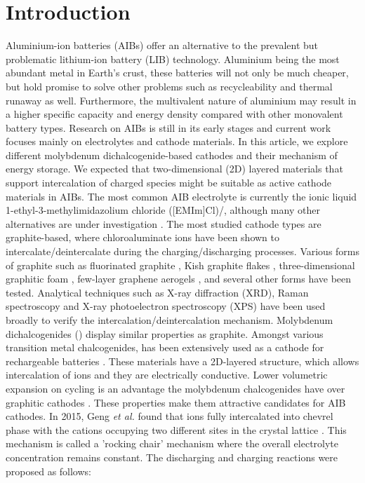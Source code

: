 \section{Introduction}
Aluminium-ion batteries (AIBs) offer an alternative to the prevalent but problematic lithium-ion battery (LIB) technology. Aluminium being the most abundant metal in Earth’s crust, these batteries will not only be much cheaper, but hold promise to solve other problems such as recycleability and thermal runaway as well. Furthermore, the multivalent nature of aluminium may result in a higher specific capacity and energy density compared with other monovalent battery types. Research on AIBs is still in its early stages and current work focuses mainly on electrolytes and cathode materials. In this article, we explore different molybdenum dichalcogenide-based cathodes and their mechanism of energy storage. We expected that two-dimensional (2D) layered materials that support intercalation of charged species might be suitable as active cathode materials in AIBs.
The most common AIB electrolyte is currently the ionic liquid 1-ethyl-3-methylimidazolium chloride ([EMIm]Cl)/, although many other alternatives are under investigation \cite{canever_acetamide_2018}. The most studied cathode types are graphite-based, where chloroaluminate ions  have been shown to intercalate/deintercalate during the charging/discharging processes. Various forms of graphite such as fluorinated graphite \cite{rani_fluorinated_2013}, Kish graphite flakes \cite{wang_kish_2017}, three-dimensional graphitic foam \cite{lin_ultrafast_2015-3}, few-layer graphene aerogels \cite{qiao_defect-free_2019}, and several other forms have been tested. Analytical techniques such as X-ray diffraction (XRD), Raman spectroscopy and X-ray photoelectron spectroscopy (XPS) have been used broadly to verify the intercalation/deintercalation mechanism. 
Molybdenum dichalcogenides () display similar properties as graphite. Amongst various transition metal chalcogenides,  has been extensively used as a cathode for rechargeable batteries \cite{li_rechargeable_2018-1, zhu_fast_2015}. These materials have a 2D-layered structure, which allows intercalation of ions and they are electrically conductive. Lower volumetric expansion on cycling is an advantage the molybdenum chalcogenides have over graphitic cathodes \cite{liang_rechargeable_2011,hu}. These properties make them attractive candidates for AIB cathodes. In 2015, Geng \textit{et al.} found that  ions fully intercalated into chevrel phase  with the cations occupying two different sites in the crystal lattice \cite{geng_reversible_2015}. This mechanism is called a 'rocking chair' mechanism where the overall electrolyte concentration remains constant. The discharging and charging reactions were proposed as follows:
